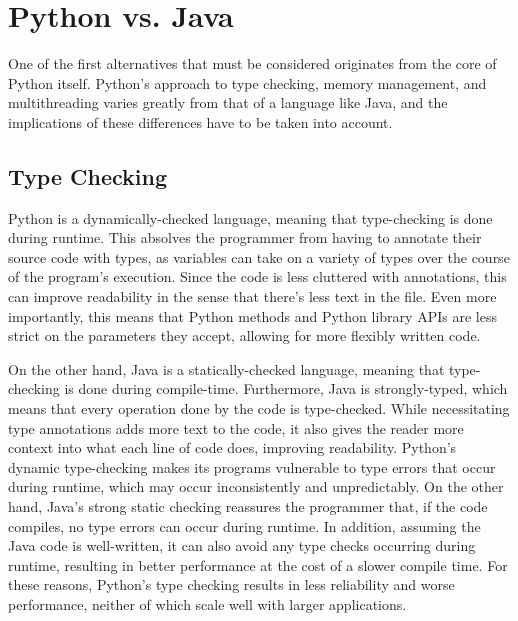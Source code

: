\section{Python vs. Java}
\par
One of the first alternatives that must be considered originates from the core 
of Python itself. Python's approach to type checking, memory management, and
multithreading varies greatly from that of a language like Java, and the
implications of these differences have to be taken into account.

\subsection{Type Checking}
\par
Python is a dynamically-checked language, meaning that type-checking is done
during runtime. This absolves the programmer from having to annotate
their source code with types, as variables can take on a variety of types over
the course of the program's execution. Since the code is less cluttered with
annotations, this can improve readability in the sense that there's less text
in the file. Even more importantly, this means that Python methods and Python
library APIs are less strict on the parameters they accept, allowing for more 
flexibly written code.
\par
On the other hand, Java is a statically-checked language, meaning that type-
checking is done during compile-time. Furthermore, Java is strongly-typed, which
means that every operation done by the code is type-checked. While necessitating
type annotations adds more text to the code, it also gives the reader more
context into what each line of code does, improving readability. Python's
dynamic type-checking makes its programs vulnerable to type errors that occur
during runtime, which may occur inconsistently and unpredictably. On the other
hand, Java's strong static checking reassures the programmer that, if the code
compiles, no type errors can occur during runtime. In addition, assuming the
Java code is well-written, it can also avoid any type checks occurring during
runtime, resulting in better performance at the cost of a slower compile time.
For these reasons, Python's type checking results in less reliability and worse
performance, neither of which scale well with larger applications.

